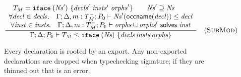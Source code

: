 \begin{figure}


\[
\frac{
\begin{array}{c}
T_M = \texttt{iface}\:(\mathit{Ns}')~\{\mathit{decls}'~\mathit{insts}'~\mathit{orphs}'\} \qquad
\mathit{Ns}' \supseteq \mathit{Ns} \qquad \\
\forall \mathit{decl} \in \mathit{decls}.\quad \Gamma; \Delta, m : T_M^-; P_0 \vdash \mathit{Ns}'(\textsf{occname}(\mathit{decl})) \le \mathit{decl} \\
\forall \mathit{inst} \in \mathit{insts}.\quad \Gamma; \Delta, m : T_M^-; P_0 \vdash \mathit{orphs} \cup \mathit{orphs}' ~\textsf{solves}~ \mathit{inst}
\end{array}
}{
\Gamma; \Delta; P_0 \vdash T_M \le \texttt{iface}\:(\mathit{Ns})~\{\mathit{decls}\, \mathit{insts}\, \mathit{orphs}\}
}
\quad(\textsc{SubMod})
\]

\caption{
Every declaration is rooted by an export.  Any non-exported declarations are dropped when typechecking signature; if they are thinned out that is an error.
}
\label{typing:top-subtyping}


\end{figure}


